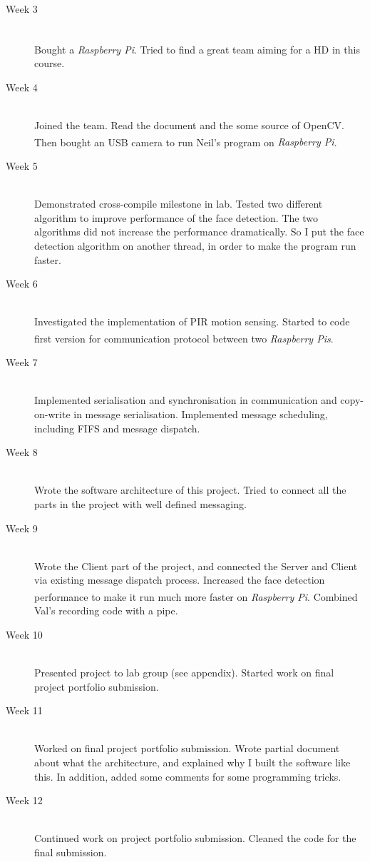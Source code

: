 \documentclass[11pt,a4paper,titlepage]{report}
\newcommand{\rpi}{\textit{Raspberry Pi\textsuperscript{\textregistered}}}
\newcommand{\rpis}{\textit{Raspberry Pi\textsuperscript{\textregistered}s}}
\begin{document}
\begin{description}

  \item[Week 3] \hfill \\
      Bought a \rpi. Tried to find a great team aiming for a HD in this course.

  \item[Week 4] \hfill \\
      Joined the team. Read the document and the some source of OpenCV. Then bought an USB camera to run Neil's program on \rpi.
  \item[Week 5] \hfill \\
      Demonstrated cross-compile milestone in lab. Tested two different algorithm to improve performance of the face detection. The two algorithms did not increase the performance dramatically. So I put the face detection algorithm on another thread, in order to make the program run faster.
  \item[Week 6] \hfill \\
      Investigated the implementation of PIR motion sensing. Started to code first version for communication protocol between two \rpis. 
  \item[Week 7] \hfill \\
       Implemented serialisation and synchronisation in communication and copy-on-write in message serialisation. Implemented message scheduling, including FIFS and message dispatch.
  \item[Week 8] \hfill \\
       Wrote the software architecture of this project. Tried to connect all the parts in the project with well defined messaging.
  \item[Week 9] \hfill \\
       Wrote the Client part of the project, and connected the Server and Client via 
		  existing message dispatch process. Increased the face detection performance to make it run much more faster on \rpi. Combined Val's recording code with a pipe.
  \item[Week 10] \hfill \\
      Presented project to lab group (see appendix). Started work on final project portfolio submission.
  \item[Week 11] \hfill \\
      Worked on final project portfolio submission. Wrote partial document about what the architecture, and explained why I built the software like this. In addition, added some comments for some programming tricks.
  \item[Week 12] \hfill \\
      Continued work on project portfolio submission. Cleaned the code for the final submission.

\end{description}
\end{document}
